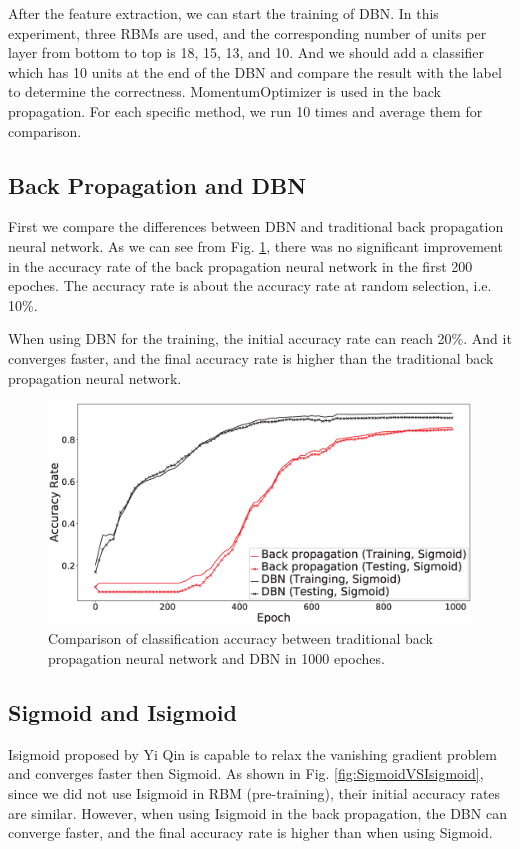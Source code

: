 \documentclass{modified}
\begin{document}
After the feature extraction, we can start the training of DBN. In this experiment, three RBMs are used, and the corresponding number of units per layer from bottom to top is 18, 15, 13, and 10. And we should add a classifier which has 10 units at the end of the DBN and compare the result with the label to determine the correctness. MomentumOptimizer is used in the back propagation. For each specific method, we run 10 times and average them for comparison.

\subsection{Back Propagation and DBN}
First we compare the differences between DBN and traditional back propagation neural network. As we can see from Fig. \ref{fig:dbnVSbp}, there was no significant improvement in the accuracy rate of the back propagation neural network in the first 200 epoches. The accuracy rate is about the accuracy rate at random selection, i.e. 10\%. 

When using DBN for the training, the initial accuracy rate can reach 20\%. And it converges faster, and the final accuracy rate is higher than the traditional back propagation neural network.

\begin{figure}[htbp]
	\centering
	\includegraphics[width=\columnwidth]{dbnVSbp.eps}
	\caption{Comparison of classification accuracy between traditional back propagation neural network and DBN in 1000 epoches.}
	\label{fig:dbnVSbp}
\end{figure}

\subsection{Sigmoid and Isigmoid}
Isigmoid proposed by Yi Qin \cite{YiThe} is capable to relax the vanishing gradient problem and converges faster then Sigmoid. As shown in Fig. \ref{fig:SigmoidVSIsigmoid}, since we did not use Isigmoid in RBM (pre-training), their initial accuracy rates are similar. However, when using Isigmoid in the back propagation, the DBN can converge faster, and the final accuracy rate is higher than when using Sigmoid.
\end{document}
